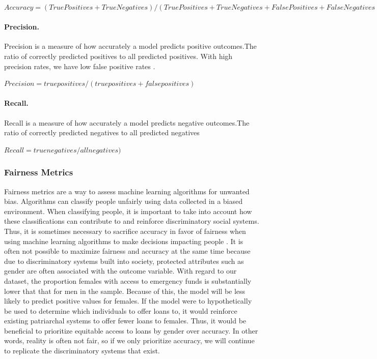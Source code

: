 \documentclass[water,article,submit,moreauthors,pdftex]{mdpi}
\begin{document}
\(Accuracy = (True Positives + True Negatives) / (True Positives + True Negatives + False Positives + False Negatives)\)

\hypertarget{precision.}{%
\paragraph{Precision.}\label{precision.}}

Precision is a measure of how accurately a model predicts positive
outcomes.The ratio of correctly predicted positives to all predicted
positives. With high precision rates, we have low false positive rates
\citep{juba2019precision, gupta2021recall}.

\(Precision = true positives / (true positives + false positives)\)

\hypertarget{recall.}{%
\paragraph{Recall.}\label{recall.}}

Recall is a measure of how accurately a model predicts negative
outcomes.The ratio of correctly predicted negatives to all predicted
negatives\citep{gupta2021recall}

\(Recall = true negatives / all negatives)\)

\hypertarget{fairness-metrics}{%
\subsubsection{Fairness Metrics}\label{fairness-metrics}}

Fairness metrics are a way to assess machine learning algorithms for
unwanted bias. Algorithms can classify people unfairly using data
collected in a biased environment. When classifying people, it is
important to take into account how these classifications can contribute
to and reinforce discriminatory social systems. Thus, it is sometimes
necessary to sacrifice accuracy in favor of fairness when using machine
learning algorithms to make decisions impacting people
\citep[\citet{kamiran2012data},
\citet{menon2018cost}]{zliobaite2015relation}. It is often not possible
to maximize fairness and accuracy at the same time because due to
discriminatory systems built into society, protected attributes such as
gender are often associated with the outcome variable. With regard to
our dataset, the proportion females with access to emergency funds is
substantially lower that that for men in the sample. Because of this,
the model will be less likely to predict positive values for females. If
the model were to hypothetically be used to determine which individuals
to offer loans to, it would reinforce existing patriarchal systems to
offer fewer loans to females. Thus, it would be beneficial to prioritize
equitable access to loans by gender over accuracy. In other words,
reality is often not fair, so if we only prioritize accuracy, we will
continue to replicate the discriminatory systems that exist.
\end{document}
